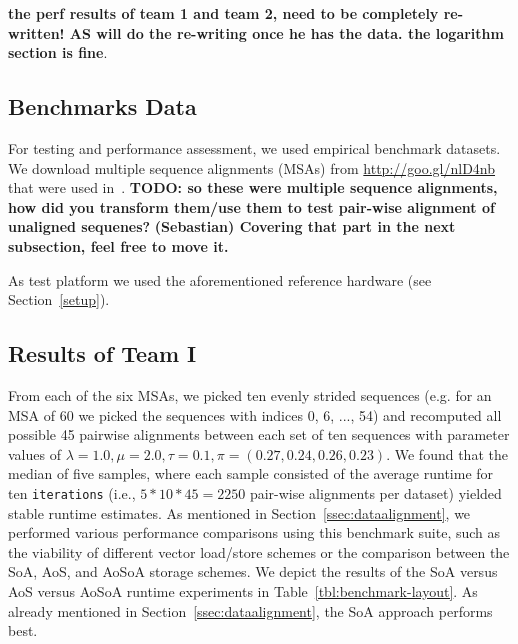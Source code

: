 \documentclass[runningheads,a4paper]{llncs}
\begin{document}
{\bf the perf results of team 1 and team 2, need to be completely re-written! AS will do the re-writing once he has the data. the logarithm section is fine}.

\subsection{Benchmarks Data}
\label{ssec:benchmark}



For testing and performance assessment, we used empirical benchmark datasets. We download multiple sequence alignments (MSAs) from \url{http://goo.gl/nlD4nb}
that were used in~\cite{bininda2005transalign}.
{\bf TODO: so these were multiple sequence alignments, how did you transform them/use them to test pair-wise alignment of unaligned sequenes?}
{\bf (Sebastian) Covering that part in the next subsection, feel free to move it. }

As test platform we used the aforementioned reference hardware (see Section~\ref{setup}).

\subsection{Results of Team I}
\label{res-team-1}

From each of the six MSAs, we picked ten evenly strided sequences
(e.g. for an MSA of 60 we picked the sequences with indices 0, 6, ..., 54)
and recomputed all possible 45 pairwise alignments between
each set of ten sequences with parameter values of
$\lambda=1.0, \mu=2.0, \tau=0.1, \pi=(0.27, 0.24, 0.26, 0.23)$.
We found that the median of five samples, where each sample consisted of the average runtime for ten \texttt{iterations}
(i.e., $5*10*45 = 2250$ pair-wise alignments per dataset)
yielded stable runtime estimates.
As mentioned in Section~\ref{ssec:dataalignment}, we performed various performance comparisons using this benchmark suite,
such as the viability of different vector load/store schemes or the comparison between the SoA, AoS, and AoSoA storage schemes.
We depict the results of the SoA versus AoS versus AoSoA runtime experiments in Table~\ref{tbl:benchmark-layout}.
As already mentioned in Section~\ref{ssec:dataalignment}, the SoA approach performs best.
\end{document}
